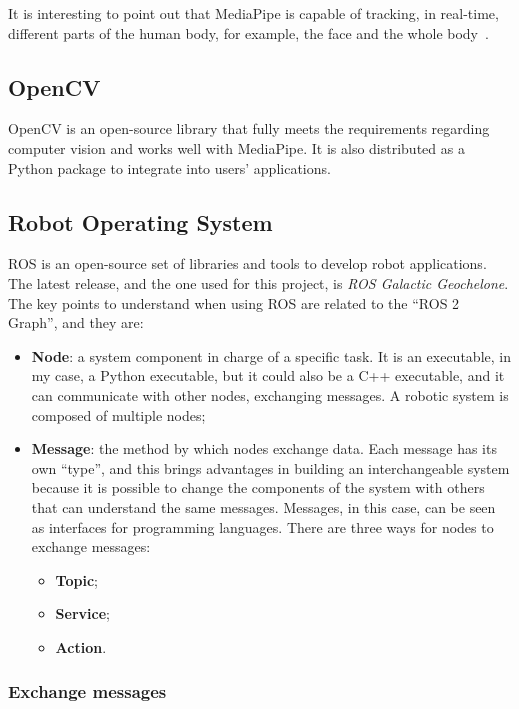 \documentclass[../thesis.tex]{subfiles}
\begin{document}
It is interesting to point out that MediaPipe is capable of tracking, in real-time, different parts of the human body, for example, the face and the whole body~\cite{site:mediapipe}.

\subsection{OpenCV}
OpenCV is an open-source library that fully meets the requirements regarding computer vision and works well with MediaPipe. It is also distributed as a Python package to integrate into users' applications. 

\subsection{Robot Operating System}
\acrfull{ROS} is an open-source set of libraries and tools to develop robot applications. The latest release, and the one used for this project, is \textit{ROS Galactic Geochelone}. The key points to understand when using \acrshort{ROS} are related to the ``ROS 2 Graph'', and they are:
\begin{itemize}
    \item \textbf{Node}: a system component in charge of a specific task. It is an executable, in my case, a Python executable, but it could also be a C++ executable, and it can communicate with other nodes, exchanging messages. A robotic system is composed of multiple nodes; 
    \item \textbf{Message}: the method by which nodes exchange data. Each message has its own ``type'', and this brings advantages in building an interchangeable system because it is possible to change the components of the system with others that can understand the same messages. Messages, in this case, can be seen as interfaces for programming languages. There are three ways for nodes to exchange messages: 
        \begin{itemize}
            \item \textbf{Topic};
            \item \textbf{Service};
            \item \textbf{Action}.
        \end{itemize}
\end{itemize}
\subsubsection{Exchange messages}
\end{document}
